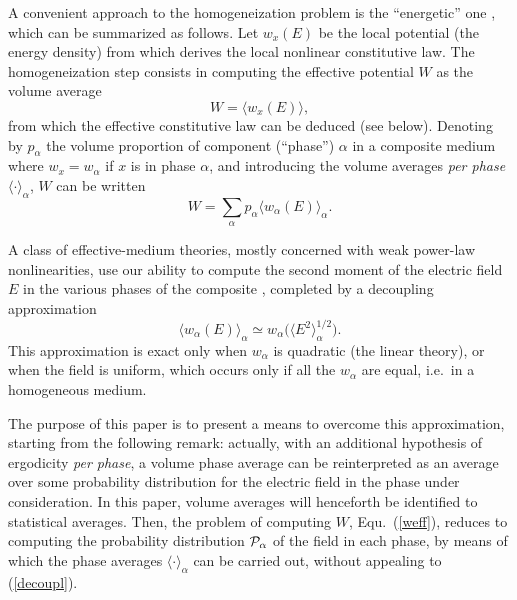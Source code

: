 A convenient approach to the homogeneization problem is the ``energetic''
one \cite{HILL63,PONT92b}, which can be summarized as follows. Let $w_x(E)$
be the local potential (the energy density) from which derives the local
nonlinear constitutive law. The homogeneization step consists in computing
the effective potential $W$ as the volume average
\begin{equation}
W=\langle w_x(E)\rangle,
\end{equation}
from which the effective constitutive law can be deduced (see below).
Denoting by $p_\alpha$ the volume proportion of component (``phase'')
$\alpha$ in a composite medium where $w_x=w_\alpha$ if $x$ is in phase
$\alpha$, and introducing the volume averages {\em per phase}
$\langle\cdot\rangle_\alpha$, $W$ can be written
\begin{equation}
\label{weff}
W=\sum_\alpha p_\alpha \langle w_\alpha(E)\rangle_\alpha.
\end{equation}

A class of effective-medium theories, mostly concerned with weak
power-law nonlinearities, use our ability to compute the second moment
of the electric field $E$ in the various phases of the composite
\cite{BERG78}, completed by a decoupling approximation \cite{ZENG88,HUI95a}
\begin{equation}
\label{decoupl}
\langle w_\alpha(E)\rangle_\alpha\simeq
w_\alpha\bigr(\langle E^2\rangle_\alpha^{1/2}\bigl).
\end{equation}
This approximation is exact only when $w_\alpha$ is quadratic
(the linear theory), or when the field is uniform, which occurs only
if all the $w_\alpha$ are equal, i.e.\ in a homogeneous medium.

The purpose of this paper is to present a means to overcome this
approximation, starting from the following remark: actually, with
an additional hypothesis of ergodicity {\em per phase}, a volume phase
average can be reinterpreted as an average over some probability
distribution for the electric field in the phase under consideration.
In this paper, volume averages will henceforth be identified to
statistical averages. Then, the problem of computing $W$,
Equ.\ (\ref{weff}), reduces to computing the probability distribution
${\cal{P}}_\alpha$ of the field in each phase, by means of which the
phase averages $\langle\cdot\rangle_\alpha$ can be carried out,
without appealing to (\ref{decoupl}).

